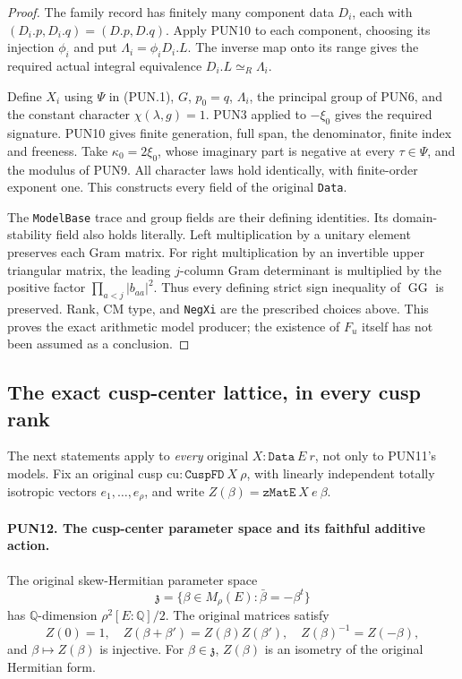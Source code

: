 \begin{proof}
The family record has finitely many component data \(D_i\),
each with \((D_i.p,D_i.q)=(D.p,D.q)\).  Apply PUN10 to each
component, choosing its injection \(\phi_i\) and put
\(\Lambda_i=\phi_iD_i.L\).  The inverse map onto its range
gives the required actual integral equivalence
\(D_i.L\simeq_R\Lambda_i\).

Define \(X_i\) using \(\Psi\) in (PUN.1), \(G\),
\(p_0=q\), \(\Lambda_i\), the principal group of PUN6, and
the constant character \(\chi(\lambda,g)=1\).  PUN3 applied
to \(-\xi_0\) gives the required signature.  PUN10 gives
finite generation, full span, the denominator, finite index and
freeness.  Take \(\kappa_0=2\xi_0\), whose imaginary part is
negative at every \(\tau\in\Psi\), and the modulus of PUN9.
All character laws hold identically, with finite-order exponent
one.  This constructs every field of the original \texttt{Data}.

The \texttt{ModelBase} trace and group fields are their defining
identities.  Its domain-stability field also holds literally.
Left multiplication by a unitary element preserves each Gram
matrix.  For right multiplication by an invertible upper
triangular matrix, the leading \(j\)-column Gram determinant
is multiplied by the positive factor
\(\prod_{a<j}|b_{aa}|^2\).  Thus every defining strict sign
inequality of \(\operatorname{GG}\) is preserved.  Rank,
CM type, and \texttt{NegXi} are the prescribed choices above.
This proves the exact arithmetic model producer; the existence
of \(F_u\) itself has not been assumed as a conclusion.
\end{proof}

\subsection{The exact cusp-center lattice, in every cusp rank}

The next statements apply to \emph{every} original
\(X:\texttt{Data}\ E\ r\), not only to PUN11's models.
Fix an original cusp \(\mathrm{cu}:\texttt{CuspFD}\ X\ \rho\),
with linearly independent totally isotropic vectors
\(e_1,\ldots,e_\rho\), and write
\(Z(\beta)=\texttt{zMatE}\ X\ e\ \beta\).

\paragraph{PUN12. The cusp-center parameter space and its faithful additive action.}
\label{claim:PUN12}
The original skew-Hermitian parameter space
\[
 \mathfrak z=\{\beta\in M_\rho(E):\bar\beta=-\beta^t\}
 \tag{PUN.11}
\]
has \(\mathbb Q\)-dimension \(\rho^2[E:\mathbb Q]/2\).
The original matrices satisfy
\[
 Z(0)=1,\quad Z(\beta+\beta')=Z(\beta)Z(\beta'),\quad
 Z(\beta)^{-1}=Z(-\beta),
 \tag{PUN.12}
\]
and \(\beta\mapsto Z(\beta)\) is injective.
For \(\beta\in\mathfrak z\), \(Z(\beta)\) is an isometry
of the original Hermitian form.

